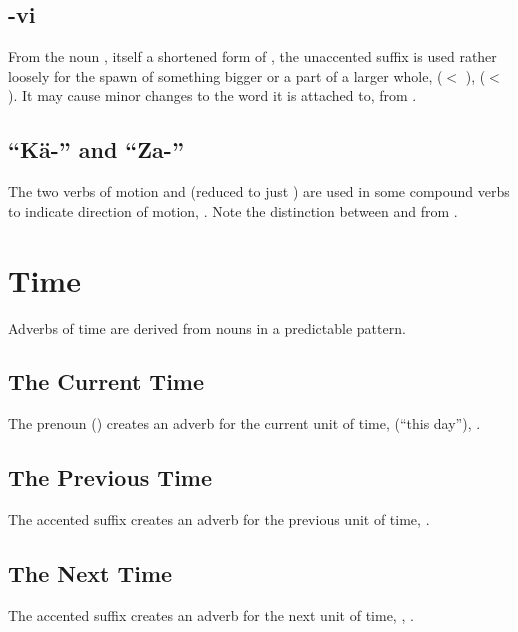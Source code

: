 \subsection{-vi} From the noun , itself a shortened form of
 , the unaccented suffix  is used rather
loosely for the spawn of something bigger or a part of a larger whole,
  ($<$  ), 
 ($<$  ).  It may
cause minor changes to the word it is attached to, 
 from  .

\subsection{``Kä-'' and ``Za-''} The two verbs of motion  
and   (reduced to just ) are used in some
compound verbs to indicate direction of motion, 
.  Note the distinction between  
and   from  .


\section{Time}
\noindent Adverbs of time are derived from nouns in a predictable
pattern.

\subsection{The Current Time} The prenoun 
() creates an adverb for the current unit
of time,   (``this day''),  . 

\subsection{The Previous Time} The accented suffix  creates an
adverb for the previous unit of time,  
 .

\subsection{The Next Time} The accented suffix  creates an
adverb for the next unit of time,  , 
 .
